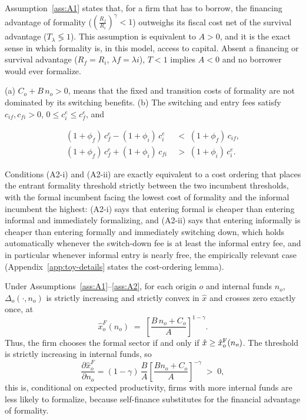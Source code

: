 \documentclass[12pt]{article}
\begin{document}
Assumption~\ref{ass:A1} states that, for a firm that has to borrow, the financing advantage of formality ($\left(\frac{R_{f}}{R_{i}}\right)^{\gamma} < 1$) outweighs its fiscal cost net of the survival advantage ($T_{\lambda} \lessgtr 1$). This assumption is equivalent to $A>0$, and it is the exact sense in which formality is, in this model, access to capital. Absent a financing or survival advantage ($R_{f}=R_{i}$, $\lambda{f}=\lambda{i}$), $T<1$ implies $A<0$ and no borrower would ever formalize.
 
\begin{assumption}
\label{ass:A2}
(a) $C_{o}+B\,n_{o}>0$, means that the fixed and transition costs of formality are not dominated by its switching benefits. (b) The switching and entry fees satisfy $c_{if},c_{fi}>0$, $0\leq c^e_{i}\leq c^e_{f}$, and

\begin{align}
  (1+\phi_{f})\,c^e_{f}-(1+\phi_{i})\,c^e_{i}
  \;&<\;(1+\phi_{f})\,c_{if},
  \tag{A2-i}\label{eq:toy-A2i}\\
  (1+\phi_{f})\,c^e_{f}+(1+\phi_{i})\,c_{fi}
  \;&>\;(1+\phi_{i})\,c^e_{i}.
  \tag{A2-ii}\label{eq:toy-A2ii}
\end{align}
\end{assumption}

Conditions (A2-i) and (A2-ii) are exactly equivalent to a cost ordering that places the entrant formality threshold strictly between the two incumbent thresholds, with the formal incumbent facing the lowest cost of formality and the informal incumbent the highest: (A2-i) says that entering formal is cheaper than entering informal and immediately formalizing, and (A2-ii) says that entering informally is cheaper than entering formally and immediately switching down, which holds automatically whenever the switch-down fee is at least the informal entry fee, and in particular whenever informal entry is nearly free, the empirically relevant case (Appendix~\ref{app:toy-details} states the cost-ordering lemma).

\begin{proposition}
\label{prop:threshold}
Under Assumptions~\ref{ass:A1}--\ref{ass:A2}, for each origin $o$ and internal funds $n_{o}$, $\Delta_{o}(\cdot,n_{o})$ is strictly increasing and strictly convex in $\hat x$ and crosses zero exactly once, at
\begin{equation}
  \hat x^F_{o}(n_{o})
  \;=\;\left[\frac{B\,n_{o}+C_{o}}{A}\right]^{1-\gamma} .
  \label{eq:toy-threshold}
\end{equation}
Thus, the firm chooses the formal sector if and only if $\hat{x}\geq\hat{x}^{\mathrm{F}}_{o}(n_{o})$. The threshold is strictly increasing in internal funds, so
\begin{equation}
  \frac{\partial \hat x^F_{o}}{\partial n_{o}}
  = (1-\gamma)\,\frac{B}{A}
    \left[\frac{Bn_{o}+C_{o}}{A}\right]^{-\gamma} \;>\;0,
  \label{eq:toy-dthdn}
\end{equation}
this is, conditional on expected productivity, firms with more internal funds are less likely to formalize, because self-finance substitutes for the financial advantage of formality.
\end{proposition}
 
\end{document}
